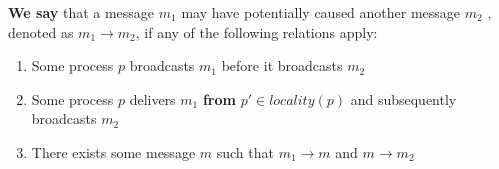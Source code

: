\documentclass[a4paper]{article}
\begin{document}
{\bf We say} that a message $m_1$ may have potentially caused another message $m_2$ , denoted as $m_1\to m_2$, if any of the following relations apply:
\begin{enumerate}
	\item Some process $p$ broadcasts $m_1$ before it broadcasts $m_2$
	\item Some process $p$ delivers $m_1$ {\bf from} $p'\in \textit{locality}(p)$ and subsequently broadcasts $m_2$
	\item There exists some message $m$ such that $m_1 \to m$ and $m \to m_2$
\end{enumerate}
\end{document}
